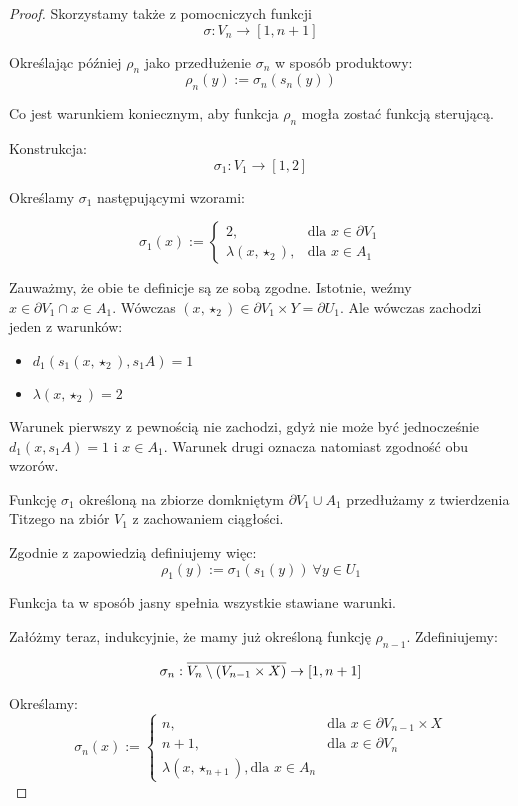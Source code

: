 \begin{thm}
\begin{proof}
  Skorzystamy także z pomocniczych funkcji
  $$\sigma: V_n \rightarrow [1,n+1]$$
  
  Określając później $\rho_n$ jako przedłużenie $\sigma_n$ w sposób produktowy:
  $$\rho_n(y) := \sigma_n(s_n(y))$$
  
  Co jest warunkiem koniecznym, aby funkcja $\rho_n$ mogła zostać funkcją sterującą.

  Konstrukcja:
  $$\sigma_1: V_1 \rightarrow [1,2]$$
  
  Określamy $\sigma_1$ następującymi wzorami:
  
  $$
  \sigma_1(x) := 
    \begin{cases}
      2,&\mbox{dla }x \in \partial V_1 \\
      \lambda(x, \star_2),& \mbox{dla }x \in A_1 
    \end{cases}
  $$
  
  Zauważmy, że obie te definicje są ze sobą zgodne. Istotnie, weźmy $x \in \partial V_1 \cap x \in A_1$. Wówczas $(x, \star_2) \in \partial V_1 \times Y = \partial U_1$. Ale wówczas zachodzi jeden z warunków:
  
  \begin{itemize}
    \item $d_1(s_1 (x, \star_2), s_1 A) = 1$
    \item $\lambda(x, \star_2) = 2$
  \end{itemize}

  Warunek pierwszy z pewnością nie zachodzi, gdyż nie może być jednocześnie $d_1(x, s_1 A) = 1$ i $x \in A_1$.
  Warunek drugi oznacza natomiast zgodność obu wzorów.
  
  Funkcję $\sigma_1$ określoną na zbiorze domkniętym $\partial V_1 \cup A_1$ przedłużamy z twierdzenia Titzego na zbiór $V_1$ z zachowaniem ciągłości.
  
  Zgodnie z zapowiedzią definiujemy więc:
  $$\rho_1(y) := \sigma_1(s_1(y))\ \forall y \in U_1$$
  
  Funkcja ta w sposób jasny spełnia wszystkie stawiane warunki.
  
  Załóżmy teraz, indukcyjnie, że mamy już określoną funkcję $\rho_{n-1}$. Zdefiniujemy:
  
  $$\sigma_n: \overline{V_n \setminus (V_{n-1} \times X)} \rightarrow [1,n+1]$$
  
  Określamy:
  $$
  \sigma_n(x) := 
    \begin{cases}
      n,&\mbox{dla }x \in \partial V_{n-1} \times X \\
      n+1,&\mbox{dla }x \in \partial V_n \\
      \lambda(x, \star_{n+1}),\mbox{dla }x \in A_n
    \end{cases}
  $$


\end{proof}
\end{thm}
